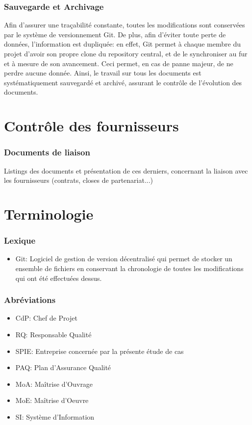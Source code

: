 \documentclass[a4paper, 18pt]{article}
\begin{document}
\section{Sauvegarde et Archivage}

Afin d'assurer une traçabilité constante, toutes les modifications sont conservées par le système de versionnement Git. De plus, afin d'éviter toute perte de données, l'information est dupliquée: en effet, Git permet à chaque membre du projet d'avoir son propre clone du repository central, et de le synchroniser au fur et à mesure de son avancement. Ceci permet, en cas de panne majeur, de ne perdre aucune donnée. Ainsi, le travail sur tous les documents est systématiquement sauvegardé et archivé, assurant le contrôle de l'évolution des documents.

\part{Contrôle des fournisseurs}

\section{Documents de liaison}

Listings des documents et présentation de ces derniers, concernant la liaison avec les fournisseurs (contrats, closes de partenariat...)

\part{Terminologie}

\section{Lexique}

\begin{itemize}
\item Git: Logiciel de gestion de version décentralisé qui permet de stocker un ensemble de fichiers en conservant la chronologie de toutes les modifications qui ont été effectuées dessus.
\end{itemize}

\section{Abréviations}

\begin{itemize}
\item CdP: Chef de Projet
\item RQ: Responsable Qualité
\item SPIE: Entreprise concernée par la présente étude de cas
\item PAQ: Plan d'Assurance Qualité
\item MoA: Maîtrise d'Ouvrage
\item MoE: Maîtrise d'Oeuvre
\item SI: Système d'Information
\end{itemize}
\end{document}
